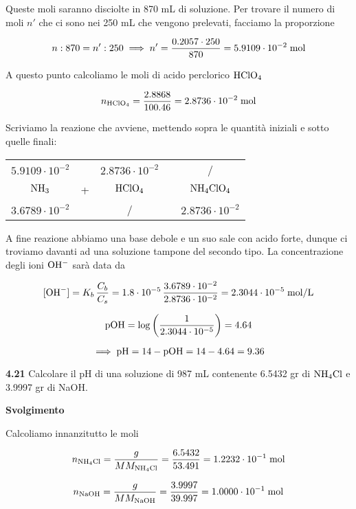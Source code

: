 Queste moli saranno disciolte in 870 mL di soluzione. Per trovare il numero di moli $n'$ che ci sono nei 250 mL che vengono prelevati, facciamo la proporzione

$$n:870=n':250
\implies
n'=\frac{0.2057 \cdot 250}{870}
=5.9109 \cdot 10^{-2} \; \rm mol$$

A questo punto calcoliamo le moli di acido perclorico $\rm HClO_4$

$$n_{\rm HClO_4}=\frac{2.8868}{100.46}=2.8736 \cdot 10^{-2} \; \rm mol$$

Scriviamo la reazione che avviene, mettendo sopra le quantità iniziali e sotto quelle finali:

\begin{center}
    \begin{tabular}{ccccc}
        $5.9109 \cdot 10^{-2}$ &  & $2.8736 \cdot 10^{-2}$ & & /\\
        $\rm NH_3$ & + & $\rm HClO_4$ & \ce{->} & $\rm NH_4ClO_4$\\
        $3.6789 \cdot 10^{-2}$ &  & / & & $2.8736 \cdot 10^{-2}$\\
    \end{tabular}
\end{center}

A fine reazione abbiamo una base debole e un suo sale con acido forte, dunque ci troviamo davanti ad una soluzione tampone del secondo tipo. La concentrazione degli ioni $\rm OH^-$ sarà data da

$$[\text{OH}^-]=K_b\,\frac{C_b}{C_s}
=1.8 \cdot 10^{-5}\,\frac{3.6789 \cdot 10^{-2}}{2.8736 \cdot 10^{-2}}
=2.3044 \cdot 10^{-5} \; \rm mol/L$$

$$\rm pOH=\log \left( \frac{1}{2.3044 \cdot 10^{-5}} \right)=4.64$$

$$\implies \rm pH=14-pOH=14-4.64=9.36$$

\vspace{0.2cm}\textbf{4.21} Calcolare il pH di una soluzione di 987 mL contenente 6.5432 gr di $\rm NH_4Cl$ e 3.9997 gr di NaOH.

\vspace{0.2cm}\large\textbf{Svolgimento}\normalsize

\vspace{0.2cm}Calcoliamo innanzitutto le moli

$$n_{\text{NH}_4\text{Cl}}=\frac{g}{MM_{\text{NH}_4\text{Cl}}}=\frac{6.5432}{53.491}=1.2232 \cdot 10^{-1} \; \rm mol$$

$$n_{\text{NaOH}}=\frac{g}{MM_{\text{NaOH}}}=\frac{3.9997}{39.997}=1.0000 \cdot 10^{-1} \; \rm mol$$

